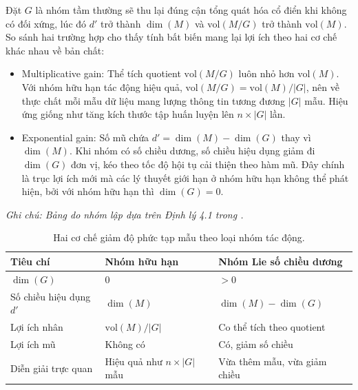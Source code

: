 Đặt $G$ là nhóm tầm thường sẽ thu lại đúng cận tổng quát hóa cổ điển khi không có đối xứng, lúc đó $d'$ trở thành $\dim(M)$ và $\mathrm{vol}(M/G)$ trở thành $\mathrm{vol}(M)$. So sánh hai trường hợp cho thấy tính bất biến mang lại lợi ích theo hai cơ chế khác nhau về bản chất:
 
\begin{itemize}
    \item Multiplicative gain: Thể tích quotient $\mathrm{vol}(M/G)$ luôn nhỏ hơn $\mathrm{vol}(M)$. Với nhóm hữu hạn tác động hiệu quả, $\mathrm{vol}(M/G) = \mathrm{vol}(M)/|G|$, nên về thực chất mỗi mẫu dữ liệu mang lượng thông tin tương đương $|G|$ mẫu. Hiệu ứng giống như tăng kích thước tập huấn luyện lên $n \times |G|$ lần.
    \item Exponential gain: Số mũ chứa $d' = \dim(M) - \dim(G)$ thay vì $\dim(M)$. Khi nhóm có số chiều dương, số chiều hiệu dụng giảm đi $\dim(G)$ đơn vị, kéo theo tốc độ hội tụ cải thiện theo hàm mũ. Đây chính là trục lợi ích mới mà các lý thuyết giới hạn ở nhóm hữu hạn không thể phát hiện, bởi với nhóm hữu hạn thì $\dim(G) = 0$.
\end{itemize}
 

 
\begin{table}[H]
    \centering
    \caption[Hai cơ chế giảm độ phức tạp mẫu theo loại nhóm tác động]{Hai cơ chế giảm độ phức tạp mẫu theo loại nhóm tác động.}
    \label{tab:two-gains}
    \vspace{2pt}
    \textit{Ghi chú: Bảng do nhóm lập dựa trên Định lý 4.1 trong \cite{tahmasebi2023exact}.}
    \vspace{4pt}
    \begin{tabular}{lll}
        \hline
        \rowcolor{gray!20}
        Tiêu chí & Nhóm hữu hạn & Nhóm Lie số chiều dương \\
        \hline
        $\dim(G)$ & $0$ & $> 0$ \\
        Số chiều hiệu dụng $d'$ & $\dim(M)$ & $\dim(M) - \dim(G)$ \\
        Lợi ích nhân & $\mathrm{vol}(M)/|G|$ & Co thể tích theo quotient \\
        Lợi ích mũ & Không có & Có, giảm số chiều \\
        Diễn giải trực quan & Hiệu quả như $n \times |G|$ mẫu & Vừa thêm mẫu, vừa giảm chiều \\
        \hline
    \end{tabular}
\end{table}
 
